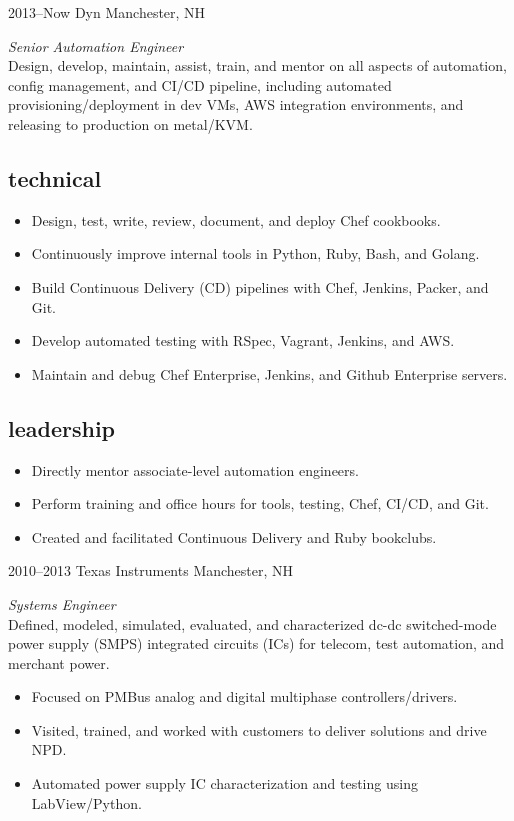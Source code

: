 \documentclass[]{vitae-cv}
\begin{document}
\begin{entrylist}


\entry
{2013--Now}
{Dyn}
{Manchester, NH}
{\emph{Senior Automation Engineer} \\
Design, develop, maintain, assist, train, and mentor on all aspects of automation, config management, and CI/CD pipeline, including automated provisioning/deployment in dev VMs, AWS integration environments, and releasing to production on metal/KVM. \\

\subsection{technical}
\begin{itemize}
\item Design, test, write, review, document, and deploy Chef cookbooks.
\item Continuously improve internal tools in Python, Ruby, Bash, and Golang.
\item Build Continuous Delivery (CD) pipelines with Chef, Jenkins, Packer, and Git.
\item Develop automated testing with RSpec, Vagrant, Jenkins, and AWS.
\item Maintain and debug Chef Enterprise, Jenkins, and Github
  Enterprise servers.
\end{itemize}

\subsection{leadership}
\begin{itemize}
\item Directly mentor associate-level automation engineers.
\item Perform training and office hours for tools, testing, Chef, CI/CD, and Git.
\item Created and facilitated Continuous Delivery and Ruby bookclubs.
\end{itemize}}


\entry
{2010--2013}
{Texas Instruments}
{Manchester, NH}
{\emph{Systems Engineer} \\
Defined, modeled, simulated, evaluated, and characterized dc-dc switched-mode power supply (SMPS) integrated circuits (ICs) for telecom, test automation, and merchant power.
\begin{itemize}
\item Focused on PMBus analog and digital multiphase controllers/drivers.
\item Visited, trained, and worked with customers to deliver solutions and drive NPD.
\item Automated power supply IC characterization and testing using LabView/Python.
\end{itemize}}


\end{entrylist}
\end{document}

